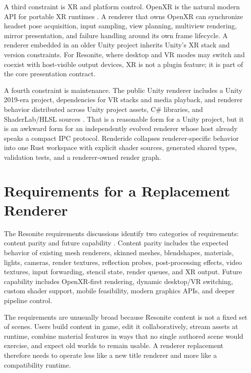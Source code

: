 \documentclass[acmtog,screen,nonacm]{acmart}
\begin{document}
A third constraint is XR and platform control. OpenXR is the natural modern API for portable XR runtimes \citep{openxrSpec}. A renderer that owns OpenXR can synchronize headset pose acquisition, input sampling, view planning, multiview rendering, mirror presentation, and failure handling around its own frame lifecycle. A renderer embedded in an older Unity project inherits Unity's XR stack and version constraints. For Resonite, where desktop and VR modes may switch and coexist with host-visible output devices, XR is not a plugin feature; it is part of the core presentation contract.

A fourth constraint is maintenance. The public Unity renderer includes a Unity 2019-era project, dependencies for VR stacks and media playback, and renderer behavior distributed across Unity project assets, C\# libraries, and ShaderLab/HLSL sources \citep{unityRendererRepo}. That is a reasonable form for a Unity project, but it is an awkward form for an independently evolved renderer whose host already speaks a compact IPC protocol. Renderide collapses renderer-specific behavior into one Rust workspace with explicit shader sources, generated shared types, validation tests, and a renderer-owned render graph.

\section{Requirements for a Replacement Renderer}

The Resonite requirements discussions identify two categories of requirements: content parity and future capability \citep{newRendererRequirements}. Content parity includes the expected behavior of existing mesh renderers, skinned meshes, blendshapes, materials, lights, cameras, render textures, reflection probes, post-processing effects, video textures, input forwarding, stencil state, render queues, and XR output. Future capability includes OpenXR-first rendering, dynamic desktop/VR switching, custom shader support, mobile feasibility, modern graphics APIs, and deeper pipeline control.

The requirements are unusually broad because Resonite content is not a fixed set of scenes. Users build content in game, edit it collaboratively, stream assets at runtime, combine material features in ways that no single authored scene would exercise, and expect old worlds to remain usable. A renderer replacement therefore needs to operate less like a new title renderer and more like a compatibility runtime.
\end{document}
